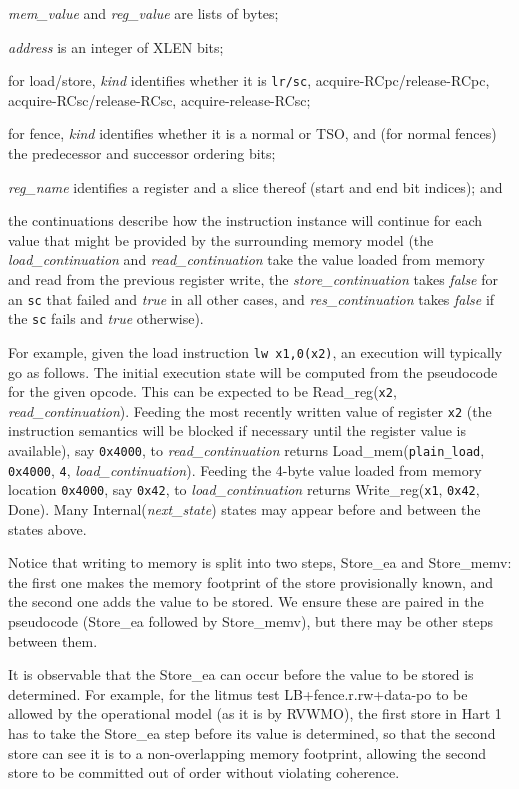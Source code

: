 \begin{tightlist}
\item {\it mem\_value} and {\it reg\_value} are lists of bytes;
\item {\it address} is an integer of XLEN bits;
\item for load/store, {\it kind} identifies whether it is {\tt lr/sc}, acquire-RCpc/release-RCpc, acquire-RCsc/release-RCsc, acquire-release-RCsc;
\item for fence, {\it kind} identifies whether it is a normal or TSO, and (for normal fences) the predecessor and successor ordering bits;
\item {\it reg\_name} identifies a register and a slice thereof (start and
  end bit indices); and
\item the continuations describe how the instruction instance will continue for each value that might be provided by the surrounding memory model (the {\it load\_continuation} and {\it read\_continuation} take the value loaded from memory and read from the previous register write, the {\it store\_continuation} takes {\it false} for an {\tt sc} that failed and {\it true} in all other cases, and {\it res\_continuation} takes {\it false} if the {\tt sc} fails and {\it true} otherwise).
\end{tightlist}

\begin{commentary}
For example, given the load instruction \verb!lw x1,0(x2)!,
an execution will typically go as follows.
The initial execution state will be computed from the pseudocode for the given opcode.
This can be expected to be {\sc Read\_reg}({\tt x2}, {\it read\_continuation}).
Feeding the most recently written value of register {\tt x2} (the instruction semantics will be blocked if necessary until the register value is available), say {\tt 0x4000}, to {\it read\_continuation} returns {\sc Load\_mem}({\tt plain\_load}, {\tt 0x4000}, {\tt 4}, {\it load\_continuation}).
Feeding the 4-byte value loaded from memory location {\tt 0x4000}, say {\tt 0x42}, to {\it load\_continuation} returns
{\sc Write\_reg}({\tt x1}, {\tt 0x42}, {\sc Done}).
Many {\sc Internal}({\it next\_state}) states may appear before and between the states above.
\end{commentary}

Notice that writing to memory is split into two steps, {\sc Store\_ea} and {\sc Store\_memv}: the first one makes the memory footprint of the store provisionally known, and the second one adds the value to be stored.
We ensure these are paired in the pseudocode ({\sc Store\_ea} followed by {\sc Store\_memv}), but there may be other steps between them.
\begin{commentary}
It is observable that the {\sc Store\_ea} can occur before the value to be stored is determined.
For example, for the litmus test LB+fence.r.rw+data-po to be allowed by the operational model (as it is by RVWMO), the first store in Hart 1 has to take the {\sc Store\_ea} step before its value is determined, so that the second store can see it is to a non-overlapping memory footprint, allowing the second store to be committed out of order without violating coherence.
\end{commentary}

